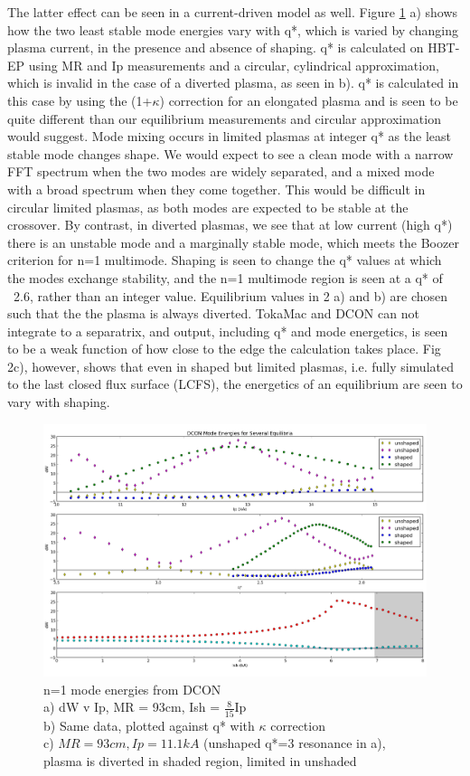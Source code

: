 \documentclass[aps,prl,twocolumn,superscriptaddress,groupedaddress]{revtex4}  %
\begin{document}
The latter effect can be seen in a current-driven model as well.  Figure \ref{DCON_dW} a) shows how the two least stable mode energies vary with q*, which is varied by changing plasma current, in the presence and absence of shaping.  q* is calculated on HBT-EP using MR and Ip measurements and a circular, cylindrical approximation, which is invalid in the case of a diverted plasma, as seen in b). q* is calculated in this case by using the (1+$\kappa$) correction for an elongated plasma and is seen to be quite different than our equilibrium measurements and circular approximation would suggest.  Mode mixing occurs in limited plasmas at integer q* as the least stable mode changes shape.  We would expect to see a clean mode with a narrow FFT spectrum when the two modes are widely separated, and a mixed mode with a broad spectrum when they come together.  This would be difficult in circular limited plasmas, as both modes are expected to be stable at the crossover.  By contrast, in diverted plasmas, we see that at low current (high q*) there is an unstable mode and a marginally stable mode, which meets the Boozer criterion for n=1 multimode\cite{Boozer}.  Shaping is seen to change the q* values at which the modes exchange stability, and the n=1 multimode region is seen at a q* of ~2.6, rather than an integer value.  Equilibrium values in 2 a) and b) are chosen such that the the plasma is always diverted.  TokaMac and DCON can not integrate to a separatrix, and output, including q* and mode energetics, is seen to be a weak function of how close to the edge the calculation takes place. Fig 2c), however, shows that even in shaped but limited plasmas, i.e. fully simulated to the last closed flux surface (LCFS), the energetics of an equilibrium are seen to vary with shaping.\par
\begin{figure}[htb]
	\centering
\includegraphics[scale=.2]{../Plots/dW_v_Ip_q_ish_fixed_MR.png}\caption{n=1 mode energies from DCON \\a) dW v Ip, MR = 93cm, Ish = $\frac{8}{15}$Ip\\  b) Same data, plotted against q* with $\kappa$ correction\\c) $MR = 93cm, Ip = 11.1kA$ (unshaped q*=3 resonance in a), plasma is diverted in shaded region, limited in unshaded}
	\label{DCON_dW}
	\end{figure}
	
\end{document}
